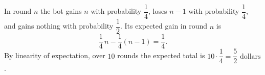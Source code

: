 In round $n$ the bot gains $n$ with probability $\dfrac14$, loses $n-1$ with probability $\dfrac14$, and gains nothing with probability $\dfrac12$. Its expected gain in round $n$ is
\[\dfrac14\,n-\dfrac14(n-1)=\dfrac14.\]
By linearity of expectation, over $10$ rounds the expected total is $10\cdot\dfrac14=\boxed{\dfrac52\text{ dollars}}$.
